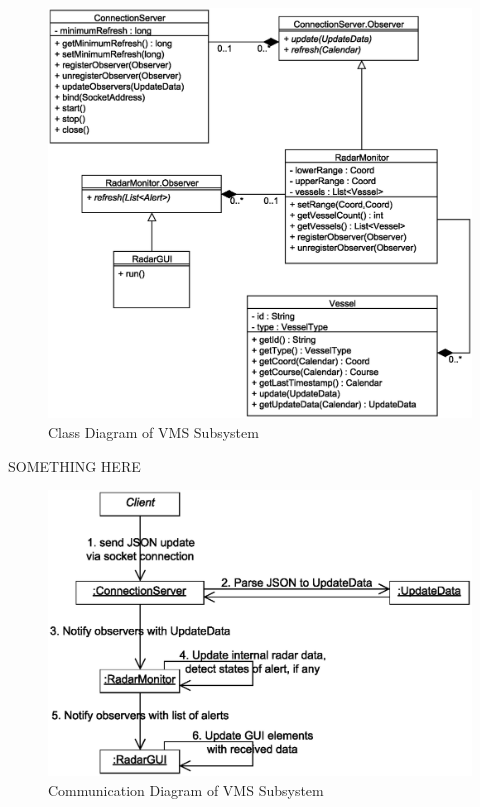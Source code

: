 \documentclass{article}
\begin{document}
\begin{figure}[!htb]	
\caption{Class Diagram of VMS Subsystem}
\centering
\includegraphics[scale=0.3]{diagrams/vms-class-diagram.eps}
\end{figure}

SOMETHING HERE

\break

\begin{figure}[!htb]
\caption{Communication Diagram of VMS Subsystem}
\centering
\includegraphics[scale=0.5]{diagrams/vms-communication-diagram.eps}
\end{figure}
\end{document}
